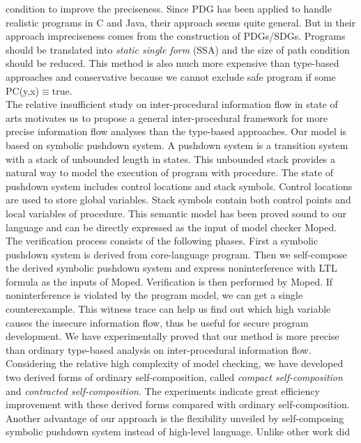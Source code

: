 \documentclass{llncs}
\begin{document}
condition\cite{DBLP:journals/tosem/SneltingRK06}\cite{DBLP:conf/sas/Snelting96}
to improve the preciseness. Since PDG has been applied to handle
realistic programs in C and Java, their approach seems quite
general. But in their approach impreciseness comes from the
construction of PDGs/SDGs. Programs should be translated into
\emph{static single form} (SSA) and the size of path condition
should be reduced. This method is also much more expensive than
type-based approaches and conservative because we cannot exclude
safe program if some PC(y,x)$\equiv$true.\\
\indent The relative insufficient study on inter-procedural
information flow in state of arts motivates us to propose a general
inter-procedural framework for more precise information flow
analyses than the type-based approaches. Our model is based on
symbolic pushdown system\cite{mcps:schwoon}. A pushdown system is a
transition system with a stack of unbounded length in states. This
unbounded stack provides a natural way to model the execution of
program with procedure. The state of pushdown system includes
control locations and stack symbols. Control locations are used to
store global variables. Stack symbols contain both control points
and local variables of procedure. This semantic model has been
proved sound to our language and can be directly expressed as the
input of model checker Moped\cite{mcps:moped}.\\
\indent The verification process consists of the following phases.
First a symbolic pushdown system is derived from core-language
program. Then we self-compose the derived symbolic pushdown system
and express noninterference with LTL formula as the inputs of Moped.
Verification is then performed by Moped. If noninterference is
violated by the program model, we can get a single counterexample.
This witness trace can help us find out which \textsf{high} variable
causes the insecure information flow, thus be useful for secure
program development. We have experimentally proved that our method
is more precise than ordinary type-based analysis on
inter-procedural information flow. Considering the relative high
complexity of model checking, we have developed two derived forms of
ordinary self-composition, called \emph{compact self-composition}
and \emph{contracted self-composition}. The experiments indicate
great efficiency improvement with these derived forms compared with
ordinary self-composition. Another advantage of our approach is the
flexibility unveiled by self-composing symbolic pushdown system
instead of high-level language. Unlike other work did
\end{document}
